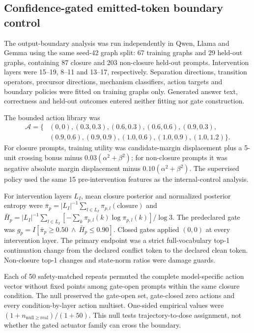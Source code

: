 \documentclass[11pt]{article}
\begin{document}
\subsection*{Confidence-gated emitted-token boundary control}
The output-boundary analysis was run independently in Qwen, Llama and Gemma using the same seed-42 graph split: 67 training graphs and 29 held-out graphs, containing 87 closure and 203 non-closure held-out prompts. Intervention layers were 15--19, 8--11 and 13--17, respectively. Separation directions, transition operators, precursor directions, mechanism classifiers, action targets and boundary policies were fitted on training graphs only. Generated answer text, correctness and held-out outcomes entered neither fitting nor gate construction.

The bounded action library was
\[
\begin{aligned}
\mathcal A=\{&(0,0),(0.3,0.3),(0.6,0.3),(0.6,0.6),(0.9,0.3),\\
&(0.9,0.6),(0.9,0.9),(1.0,0.6),(1.0,0.9),(1.0,1.2)\}.
\end{aligned}
\]
For closure prompts, training utility was candidate-margin displacement plus a 5-unit crossing bonus minus $0.03(\alpha^2+\beta^2)$; for non-closure prompts it was negative absolute margin displacement minus $0.10(\alpha^2+\beta^2)$. The supervised policy used the same 15 pre-intervention features as the internal-control analysis.

For intervention layers $L_I$, mean closure posterior and normalized posterior entropy were $\bar\pi_p=|L_I|^{-1}\sum_{l\in L_I}\pi_{p,l}(\mathrm{closure})$ and $\bar H_p=|L_I|^{-1}\sum_{l\in L_I}[-\sum_k\pi_{p,l}(k)\log\pi_{p,l}(k)]/\log 3$. The predeclared gate was $g_p=I[\bar\pi_p\geq0.50\ \land\ \bar H_p\leq0.90]$. Closed gates applied $(0,0)$ at every intervention layer. The primary endpoint was a strict full-vocabulary top-1 continuation change from the declared conflict token to the declared clean token. Non-closure top-1 changes and state-norm ratios were damage guards.

Each of 50 safety-matched repeats permuted the complete model-specific action vector without fixed points among gate-open prompts within the same closure condition. The null preserved the gate-open set, gate-closed zero actions and every condition-by-layer action multiset. One-sided empirical values were $(1+n_{\mathrm{null}\geq\mathrm{real}})/(1+50)$. This null tests trajectory-to-dose assignment, not whether the gated actuator family can cross the boundary.
\end{document}

